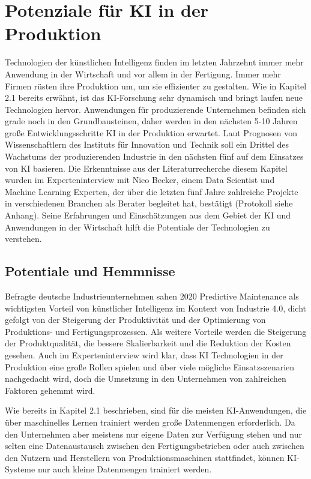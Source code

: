 \documentclass[a4paper,12pt, german]{report}
\begin{document}
\chapter{Potenziale für KI in der Produktion}
Technologien der künstlichen Intelligenz finden im letzten Jahrzehnt immer mehr Anwendung in der Wirtschaft und vor allem in der Fertigung. Immer mehr Firmen rüsten ihre Produktion um, um sie effizienter zu gestalten. Wie in Kapitel 2.1 bereits erwähnt, ist das KI-Forschung sehr dynamisch und bringt laufen neue Technologien hervor. Anwendungen für produzierende Unternehmen befinden sich grade noch in den Grundbausteinen, daher werden in den nächsten 5-10 Jahren große Entwicklungsschritte KI in der Produktion erwartet.\cite{08} 
Laut Prognosen von Wissenschaftlern des Instituts für Innovation und Technik soll ein Drittel des Wachstums der produzierenden Industrie in den nächsten fünf auf dem Einsatzes von KI basieren.\cite{24}
Die Erkenntnisse aus der Literaturrecherche  diesem Kapitel wurden im Experteninterview mit Nico Becker, einem Data Scientist und Machine Learning Experten, der über die letzten fünf Jahre zahlreiche Projekte in verschiedenen Branchen als Berater begleitet hat, bestätigt (Protokoll siehe Anhang). Seine Erfahrungen und Einschätzungen aus dem Gebiet der KI und Anwendungen in der Wirtschaft hilft die Potentiale der Technologien zu verstehen.

\section{Potentiale und Hemmnisse}

Befragte deutsche Industrieunternehmen sahen 2020 Predictive Maintenance als wichtigsten Vorteil von künstlicher Intelligenz im Kontext von Industrie 4.0, dicht gefolgt von der Steigerung der Produktivität und der Optimierung von Produktions- und Fertigungsprozessen. Als weitere Vorteile werden die Steigerung der Produktqualität, die bessere Skalierbarkeit und die Reduktion der Kosten gesehen.\cite{28} Auch im Experteninterview wird klar, dass KI Technologien in der Produktion eine große Rollen spielen und über viele mögliche Einsatzszenarien nachgedacht wird, doch die Umsetzung in den Unternehmen von zahlreichen Faktoren gehemmt wird.

Wie bereits in Kapitel 2.1 beschrieben, sind für die meisten KI-Anwendungen, die über maschinelles Lernen trainiert werden große Datenmengen erforderlich. Da den Unternehmen aber meistens nur eigene Daten zur Verfügung stehen und nur selten eine Datenaustausch zwischen den Fertigungsbetrieben oder auch zwischen den Nutzern und Herstellern von Produktionsmaschinen stattfindet, können KI-Systeme nur auch kleine Datenmengen trainiert werden. 
\end{document}

